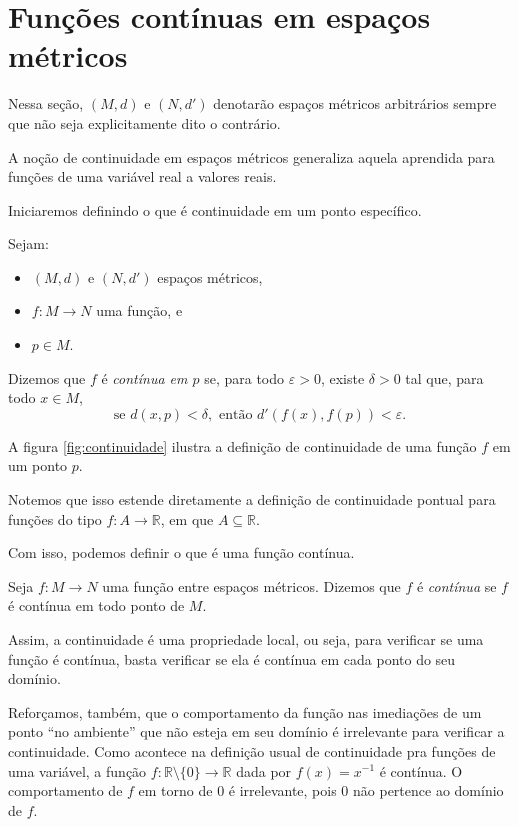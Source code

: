 
\section{Funções contínuas em espaços métricos}

Nessa seção, $(M, d)$ e $(N, d')$ denotarão espaços métricos arbitrários sempre que não seja explicitamente dito o contrário.

A noção de continuidade em espaços métricos generaliza aquela aprendida para funções de uma variável real a valores reais.

Iniciaremos definindo o que é continuidade em um ponto específico.

\begin{definition}
    Sejam:
    \begin{itemize}
        \item $(M, d)$ e $(N, d')$ espaços métricos,
        \item $f: M \to N$ uma função, e
        \item $p\in M$.
    \end{itemize}

    Dizemos que $f$ é \emph{contínua em $p$} se, para todo $\varepsilon > 0$, existe $\delta > 0$ tal que, para todo $x \in M$,
    \[
        \text{se } d(x, p) < \delta, \text{ então } d'(f(x), f(p)) < \varepsilon.
    \]
\end{definition}

A figura \ref{fig:continuidade} ilustra a definição de continuidade de uma função $f$ em um ponto $p$.

Notemos que isso estende diretamente a definição de continuidade pontual para funções do tipo $f: A\rightarrow \mathbb R$, em que $A\subseteq \mathbb R$.

Com isso, podemos definir o que é uma função contínua.

\begin{definition}
    Seja $f: M \to N$ uma função entre espaços métricos.
    Dizemos que $f$ é \emph{contínua} se $f$ é contínua em todo ponto de $M$.
\end{definition}

Assim, a continuidade é uma propriedade local, ou seja, para verificar se uma função é contínua, basta verificar se ela é contínua em cada ponto do seu domínio.

Reforçamos, também, que o comportamento da função nas imediações de um ponto ``no ambiente'' que não esteja em seu domínio é irrelevante para verificar a continuidade.
Como acontece na definição usual de continuidade pra funções de uma variável, a função $f:\mathbb R\setminus\{0\}\rightarrow \mathbb R$ dada por $f(x) = x^{-1}$ é contínua.
O comportamento de $f$ em torno de $0$ é irrelevante, pois $0$ não pertence ao domínio de $f$.

